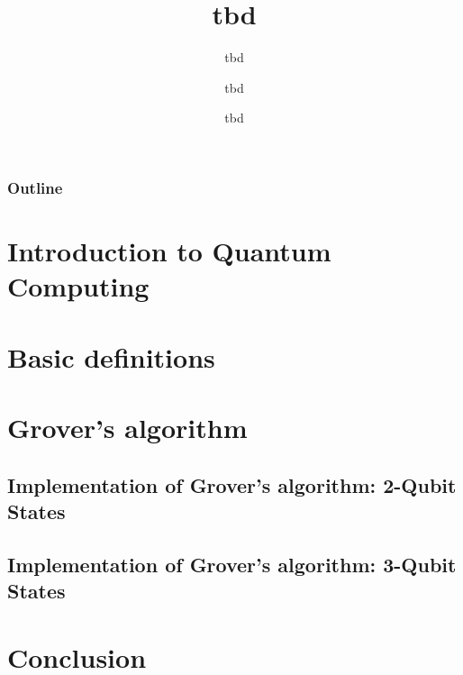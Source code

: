 \documentclass[aspectratio=169]{beamer}
\title{tbd}
\subtitle{tbd}
\date[tbd]{tbd}
\author[jmaunon]{tbd}
\begin{document}
\begin{frame}
\titlepage
\end{frame}


\begin{frame}[plain]
\frametitle{Outline}
\tableofcontents

\end{frame}

\section{Introduction to Quantum Computing}
\section{Basic definitions}



\section{Grover's algorithm}





\subsection{Implementation of Grover's algorithm: 2-Qubit States}
\subsection{Implementation of Grover's algorithm: 3-Qubit States}

\section{Conclusion}



\end{document}
